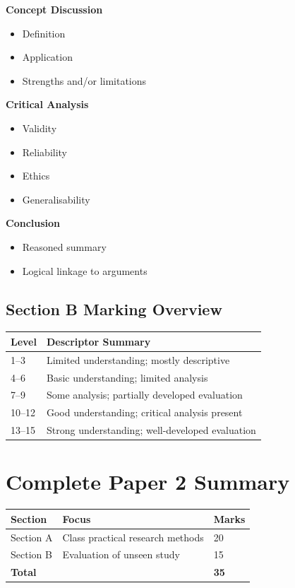 \documentclass[12pt,a4paper]{article}
\begin{document}
\textbf{Concept Discussion}
\begin{itemize}
    \item Definition
    \item Application
    \item Strengths and/or limitations
\end{itemize}

\textbf{Critical Analysis}
\begin{itemize}
    \item Validity
    \item Reliability
    \item Ethics
    \item Generalisability
\end{itemize}

\textbf{Conclusion}
\begin{itemize}
    \item Reasoned summary
    \item Logical linkage to arguments
\end{itemize}

\subsection*{Section B Marking Overview}

\begin{center}
\begin{tabular}{ll}
\toprule
\textbf{Level} & \textbf{Descriptor Summary} \\
\midrule
1--3 & Limited understanding; mostly descriptive \\
4--6 & Basic understanding; limited analysis \\
7--9 & Some analysis; partially developed evaluation \\
10--12 & Good understanding; critical analysis present \\
13--15 & Strong understanding; well-developed evaluation \\
\bottomrule
\end{tabular}
\end{center}

\section*{Complete Paper 2 Summary}

\begin{center}
\begin{tabular}{lll}
\toprule
\textbf{Section} & \textbf{Focus} & \textbf{Marks} \\
\midrule
Section A & Class practical research methods & 20 \\
Section B & Evaluation of unseen study & 15 \\
\midrule
\textbf{Total} & & \textbf{35} \\
\bottomrule
\end{tabular}
\end{center}
\end{document}
